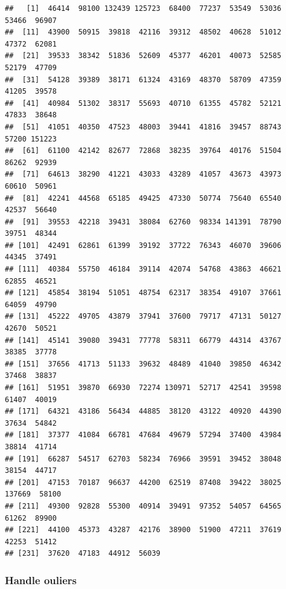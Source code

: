 \documentclass[
]{article}
\newenvironment{Shaded}{\begin{snugshade}}{\end{snugshade}}
\newcommand{\NormalTok}[1]{#1}
\newcommand{\OtherTok}[1]{\textcolor[rgb]{0.56,0.35,0.01}{#1}}
\newcommand{\SpecialCharTok}[1]{\textcolor[rgb]{0.81,0.36,0.00}{\textbf{#1}}}
\begin{document}
\begin{verbatim}
##   [1]  46414  98100 132439 125723  68400  77237  53549  53036  53466  96907
##  [11]  43900  50915  39818  42116  39312  48502  40628  51012  47372  62081
##  [21]  39533  38342  51836  52609  45377  46201  40073  52585  52179  47709
##  [31]  54128  39389  38171  61324  43169  48370  58709  47359  41205  39578
##  [41]  40984  51302  38317  55693  40710  61355  45782  52121  47833  38648
##  [51]  41051  40350  47523  48003  39441  41816  39457  88743  57200 151223
##  [61]  61100  42142  82677  72868  38235  39764  40176  51504  86262  92939
##  [71]  64613  38290  41221  43033  43289  41057  43673  43973  60610  50961
##  [81]  42241  44568  65185  49425  47330  50774  75640  65540  42537  56640
##  [91]  39553  42218  39431  38084  62760  98334 141391  78790  39751  48344
## [101]  42491  62861  61399  39192  37722  76343  46070  39606  44345  37491
## [111]  40384  55750  46184  39114  42074  54768  43863  46621  62855  46521
## [121]  45854  38194  51051  48754  62317  38354  49107  37661  64059  49790
## [131]  45222  49705  43879  37941  37600  79717  47131  50127  42670  50521
## [141]  45141  39080  39431  77778  58311  66779  44314  43767  38385  37778
## [151]  37656  41713  51133  39632  48489  41040  39850  46342  37468  38837
## [161]  51951  39870  66930  72274 130971  52717  42541  39598  61407  40019
## [171]  64321  43186  56434  44885  38120  43122  40920  44390  37634  54842
## [181]  37377  41084  66781  47684  49679  57294  37400  43984  38814  41714
## [191]  66287  54517  62703  58234  76966  39591  39452  38048  38154  44717
## [201]  47153  70187  96637  44200  62519  87408  39422  38025 137669  58100
## [211]  49300  92828  55300  40914  39491  97352  54057  64565  61262  89900
## [221]  44100  45373  43287  42176  38900  51900  47211  37619  42253  51412
## [231]  37620  47183  44912  56039
\end{verbatim}

\subsubsection{Handle ouliers}\label{handle-ouliers-5}

\begin{Shaded}
\end{Shaded}
\end{document}
